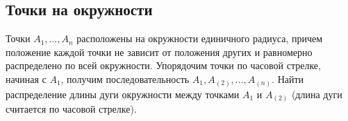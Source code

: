 \documentclass[12pt]{article}
\begin{document}
\subsection{Точки на окружности}
Точки $A_1, \dots, A_n$ расположены на окружности единичного радиуса, причем положение каждой точки не зависит от положения других и равномерно распределено по всей окружности. Упорядочим точки по часовой стрелке, начиная с $A_1$, получим последовательность $A_1, A_{(2)}, \dots, A_{(n)}$. Найти распределение длины дуги окружности между точками $A_1$ и $A_{(2)}$ (длина дуги считается по часовой стрелке).

\newpage
\end{document}
